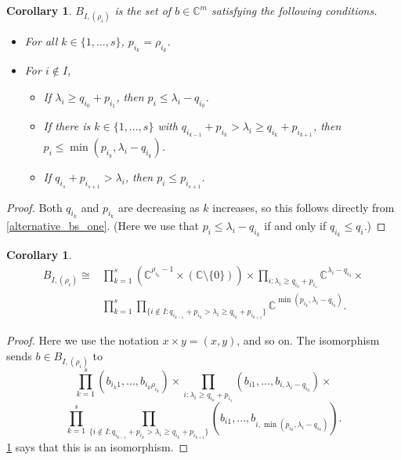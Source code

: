 \documentclass[12pt,psamsfonts]{article}
\newtheorem{corollary}[theorem]{Corollary}
\begin{document}
\begin{corollary}\label{alternative_bs_two}
    \(B_{I, (\rho_i)}\) is the set of \(b \in \mathbb{C}^m\) satisfying the following conditions.
    \begin{itemize}
        \item For all \(k \in \{1, ..., s\}\), \(p_{i_k} = \rho_{i_k}\).
        \item For \(i \notin I\),
        \begin{itemize}
            \item If \(\lambda_i \geq q_{i_0} + p_{i_1}\), then \(p_i \leq \lambda_i - q_{i_0}\).
            \item If there is \(k \in \{1, ..., s\}\) with \(q_{i_{k - 1}} + p_{i_k} > \lambda_i \geq q_{i_k} + p_{i_{k + 1}}\), then \(p_i \leq \min(p_{i_k}, \lambda_i - q_{i_k})\).
            \item If \(q_{i_s} + p_{i_{s + 1}} > \lambda_i\), then \(p_i \leq p_{i_{s + 1}}\).
        \end{itemize}
    \end{itemize}
\end{corollary}
\begin{proof}
    Both \(q_{i_k}\) and \(p_{i_k}\) are decreasing as \(k\) increases, so this follows directly from \cref{alternative_bs_one}.
    (Here we use that \(p_i \leq \lambda_i - q_{i_k}\) if and only if \(q_{i_k} \leq q_i\).)
\end{proof}

\begin{corollary}\label{bs_iso}
    \begin{align*}
        B_{I, (\rho_i)} \cong & \prod_{k = 1}^s (\mathbb{C}^{\rho_{i_k} - 1} \times (\mathbb{C} \setminus \{0\})) \times \prod_{i : \lambda_i \geq q_{i_0} + p_{i_1}} \mathbb{C}^{\lambda_i - q_{i_0}} \times \\
        & \prod_{k = 1}^s \prod_{\{i \notin I : q_{i_{k - 1}} + p_{i_k} > \lambda_i \geq q_{i_k} + p_{i_{k + 1}}\}}\mathbb{C}^{\min(p_{i_k}, \lambda_i - q_{i_k})}.
    \end{align*}
\end{corollary}
\begin{proof}
    Here we use the notation \(x \times y = (x, y)\), and so on.
    The isomorphism sends \(b \in B_{I, (\rho_i)}\) to 
    \[\prod_{k = 1}^s (b_{i_k1},..., b_{i_k\rho_{i_k}}) \times \prod_{i : \lambda_i \geq q_{i_0} + p_{i_1}} (b_{i1}, ..., b_{i, \lambda_i - q_{i_0}}) \times\]
    \[\prod_{k = 1}^s \prod_{\{i \notin I : q_{i_{k - 1}} + p_{i_k} > \lambda_i \geq q_{i_k} + p_{i_{k + 1}}\}} (b_{i1}, ..., b_{i,\min(p_{i_k}, \lambda_i - q_{i_k})}).\]
    \cref{alternative_bs_two} says that this is an isomorphism.
\end{proof}
\end{document}
